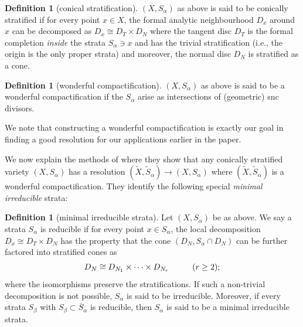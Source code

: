 \documentclass[10pt]{article}
\theoremstyle{plain}
\theoremstyle{definition}
\newtheorem{definition}[theorem]{Definition}
\numberwithin{equation}{section}
\begin{document}
\begin{definition}[conical stratification]
    $(X,S_\alpha)$ as above is said to be conically stratified if for every point $x \in X$, the formal analytic neighbourhood $D_x$ around $x$ can be decomposed as $D_x \cong D_T \times D_N$ where the tangent disc $D_T$ is the formal completion \emph{inside} the strata $S_\alpha \ni x$ and has the trivial stratification (i.e., the origin is the only proper strata) and moreover, the normal disc $D_N$ is stratified as a cone.
\end{definition}


\begin{definition}[wonderful compactification]
    $(X,S_\alpha)$ as above is said to be a wonderful compactification if the $S_\alpha$ arise as intersections of (geometric) snc divisors.
\end{definition}

We note that constructing a wonderful compactification is exactly our goal in finding a good resolution for our applications earlier in the paper.

We now explain the methods of \cite{macpherson1998making} where they show that any conically stratified variety $(X,S_\alpha)$ has a resolution $(\tilde{X},\tilde{S}_\alpha) \to (X,S_\alpha)$ where $(\tilde{X},\tilde{S}_\alpha)$ is a wonderful compactification. They identify the following special \emph{minimal irreducible} strata:

\begin{definition}[minimal irreducible strata]
    Let $(X,S_\alpha)$ be as above. We say a strata $S_\alpha$ is reducible if for every point $x \in S_\alpha$, the local decomposition $D_x \cong D_T \times D_N$ has the property that the cone $(D_N,S_\alpha \cap D_N)$ can be further factored into stratified cones as 
    \[ D_N \cong D_{N_1} \times \dots \times D_{N_r} \hspace{10 mm} (r \geq 2);\]
    where the isomorphisms preserve the stratifications. If such a non-trivial decomposition is not possible, $S_\alpha$ is said to be irreducible. Moreover, if every strata $S_\beta$ with $S_\beta \subset \overline{S}_\alpha$ is reducible, then $S_\alpha$ is said to be a minimal irreducible strata.
\end{definition}
\end{document}
